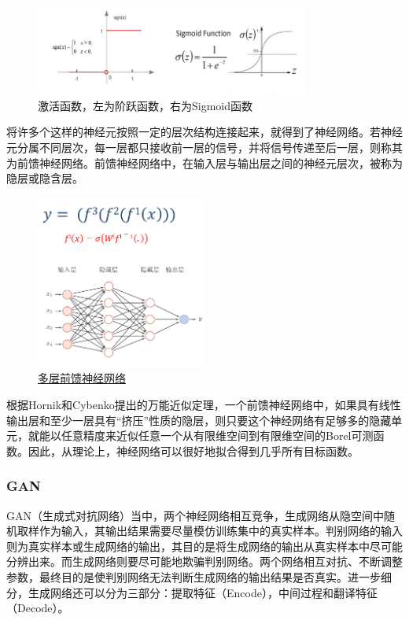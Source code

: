 \documentclass[UTF8,a4paper，12pt]{article}
\theoremstyle{theorem}
\theoremstyle{definition}
\begin{document}
\begin{figure}[htbp]
	\centering
	\includegraphics[width=0.8\textwidth]{assets/05}
	\caption{激活函数，左为阶跃函数，右为Sigmoid函数}
\end{figure}

将许多个这样的神经元按照一定的层次结构连接起来，就得到了神经网络。若神经元分属不同层次，每一层都只接收前一层的信号，并将信号传递至后一层，则称其为前馈神经网络。前馈神经网络中，在输入层与输出层之间的神经元层次，被称为隐层或隐含层。

\begin{figure}[htbp]
	\centering
	\includegraphics[width=0.5\textwidth]{assets/06}
	\caption{\href{https://nndl.github.io/nndl-book.pdf}{多层前馈神经网络}}
\end{figure}

根据Hornik和Cybenko提出的万能近似定理，一个前馈神经网络中，如果具有线性输出层和至少一层具有“挤压”性质的隐层，则只要这个神经网络有足够多的隐藏单元，就能以任意精度来近似任意一个从有限维空间到有限维空间的Borel可测函数。因此，从理论上，神经网络可以很好地拟合得到几乎所有目标函数。

\subsubsection{GAN}

GAN（生成式对抗网络）当中，两个神经网络相互竞争，生成网络从隐空间中随机取样作为输入，其输出结果需要尽量模仿训练集中的真实样本。判别网络的输入则为真实样本或生成网络的输出，其目的是将生成网络的输出从真实样本中尽可能分辨出来。而生成网络则要尽可能地欺骗判别网络。两个网络相互对抗、不断调整参数，最终目的是使判别网络无法判断生成网络的输出结果是否真实。进一步细分，生成网络还可以分为三部分：提取特征（Encode），中间过程和翻译特征（Decode）。
\end{document}
